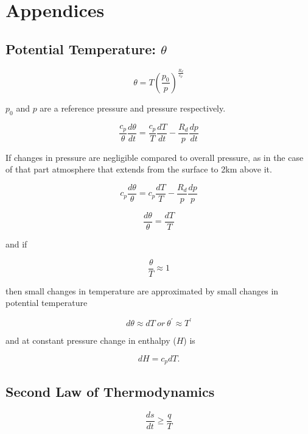 \chapter{Appendices}
\section{Potential Temperature: $\theta$}

\label{sec:pottemp}

\begin{equation}
\theta = T \left(\frac{p_{0}}{p} \right)^{\frac{R_{d}}{c_{p}}} 
\end{equation}

$p_{0}$ and $p$ are a reference pressure and pressure respectively. 

\begin{equation}
\frac{c_{p}}{\theta}\frac{d\theta}{dt} = \frac{c_{p}}{T} \frac{dT}{dt} - \frac{R_{d}}{p}\frac{dp}{dt} 
\end{equation}

If changes in pressure are negligible compared to overall pressure, as in the case of that part atmosphere that extends from the surface to 2km above it. 

\begin{equation}
c_{p}\frac{d\theta}{\theta} = c_{p}\frac{dT}{T} - \frac{R_{d}}{p}\frac{dp}{p} 
\end{equation}

\begin{equation}
\frac{d\theta}{\theta} = \frac{dT}{T} 
\end{equation}

and if 

\begin{equation}
\frac{\theta}{T} \approx 1 
\end{equation}

then small changes in temperature are approximated by small changes in potential temperature

\begin{equation}
d\theta \approx dT \ or \ \theta^{'} \approx T^{'}
\end{equation}

and at constant pressure change in enthalpy ($H$) is 

\begin{equation}
dH = c_{p}dT.
\end{equation}

\section{Second Law of Thermodynamics}
\begin{equation}
\frac{ds}{dt} \ge \frac{q}{T}
\end{equation}

